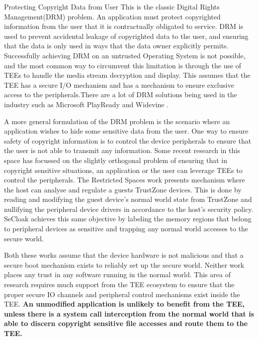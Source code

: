 \begin{subsection}{Protecting Copyright Data from User}
This is the classic Digital Rights Management(DRM) problem. An application
must protect copyrighted information from the user that it is contractually
obligated to service. DRM is used to prevent accidental leakage of
copyrighted data to the user, and ensuring that the data is only used in
ways that the data owner explicitly permits. Successfully achieving DRM on
an untrusted Operating System is not possible, and the most common way to
circumvent this limitation is through the use of TEEs to handle the media
stream decryption and display.  This assumes that the TEE has a secure I/O
mechanism  and has a mechanism to ensure exclusive access to the
peripherals.There are a lot of DRM solutions being used in the industry such
as Microsoft PlayReady\cite{microsoftplayready} and Widevine
\cite{widevine}. 

A more general formulation of the DRM problem is the scenario where an
application wishes to hide some sensitive data from the user. One way to
ensure safety of copyright information is to control the device peripherals
to ensure that the user is not able to transmit any information. Some recent
research \cite{restrictedspaces, SeCloak} in this space has focussed on the
slightly orthogonal problem of ensuring that in copyright sensitive
situations, an application or the user can leverage TEEs to control the
peripherals. The Restricted Spaces\cite{restrictedspaces} work presents
mechanism  where the host can analyse and regulate a guests TrustZone
devices. This is done by reading and modifying the guest device's normal
world state from TrustZone and nullifying the peripheral device drivers in
accordance to the host's security policy. SeCloak\cite{SeCloak} achieves
this same objective by labeling the memory regions that belong to peripheral
devices as sensitive and trapping any normal world accesses to the secure
world. %

Both these works assume that the device hardware is not malicious and that a
secure boot mechanism exists to reliably set up the secure world. 
Neither work places any trust in any software running in the normal world.
This area of research requires much support from the TEE ecosystem to
ensure that the proper secure IO channels and peripheral control mechanisms
exist inside the TEE. \textbf{An unmodified application is unlikely to
benefit from the TEE, unless there is a system call interception from the
normal world that is able to discern copyright sensitive file accesses and
route them to the TEE.}

\end{subsection}
    
